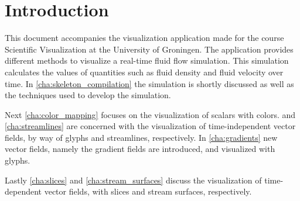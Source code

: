 \chapter*{Introduction} %
\label{cha:introduction}
 
%
This document accompanies the visualization application made for the course Scientific Visualization at the University of Groningen. The application provides different methods to visualize a real-time fluid flow simulation. 
This simulation calculates the values of quantities such as fluid density and fluid velocity over time. In \cref{cha:skeleton_compilation} the simulation is shortly discussed as well as the techniques used to develop the simulation. 

Next \cref{cha:color_mapping} focuses on the visualization of scalars with colors.  and \cref{cha:streamlines} are concerned with the visualization of time-independent vector fields, by way of glyphs and streamlines, respectively. In \cref{cha:gradients} new vector fields, namely the gradient fields are introduced, and visualized with glyphs. 

Lastly \cref{cha:slices} and \cref{cha:stream_surfaces} discuss the visualization of time-dependent vector fields, with slices and stream surfaces, respectively. 

